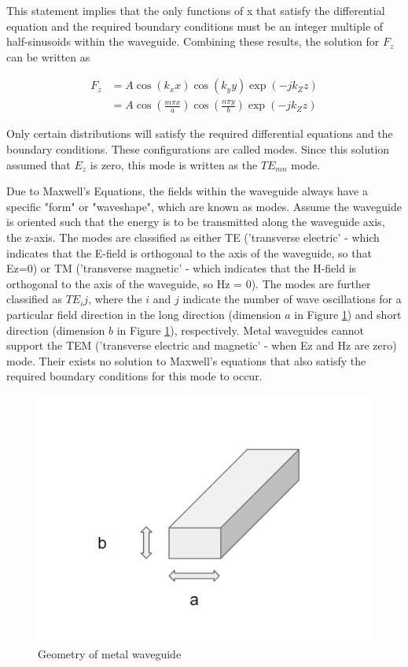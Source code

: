 \documentclass[a4paper,12pt]{report}
\begin{document}
This statement implies that the only functions of x that satisfy
the differential equation and the required boundary conditions
must be an integer multiple of half-sinusoids within the waveguide.
Combining these results, the solution for $F_z$ can be written as

\begin{equation}
  \begin{split}
    F_z &= A \cos(k_x x)\cos(k_y y)\exp(-j k_Z z) \\
        & = A \cos(\frac{m\pi x}{a}) \cos(\frac{n \pi y}{b})\exp(-j k_Z z)
  \end{split}
\end{equation}

Only certain distributions will satisfy the required differential equations
and the boundary conditions. These configurations are called modes.
Since this solution assumed that $E_z$ is zero, this mode is written as the $TE_{mn}$ mode.

Due to Maxwell's Equations,
the fields within the waveguide always have a specific "form" or "waveshape",
which are known as modes.
Assume the waveguide is oriented such that the energy is to be transmitted along the waveguide axis, the z-axis.
The modes are classified as either TE
('transverse electric' - which indicates that the E-field is orthogonal to the axis of the waveguide, so that Ez=0)
or TM ('transverse magnetic' - which indicates that the H-field is orthogonal to the axis of the waveguide, so Hz = 0).
The modes are further classified as $TE_ij$,
where the $i$ and $j$ indicate the number of wave oscillations for a particular
field direction in the long direction (dimension $a$ in Figure \ref{fig:metal_waveguide_geometry})
and short direction (dimension $b$ in Figure \ref{fig:metal_waveguide_geometry}), respectively.
Metal waveguides cannot support the TEM
('transverse electric and magnetic' - when Ez and Hz are zero) mode.
Their exists no solution to Maxwell's equations
that also satisfy the required boundary conditions for this mode to occur.

\begin{figure}
  \begin{center}
    \includegraphics[clip, keepaspectratio, width=0.5\linewidth]{img/metal_waveguide_with_dims.png}
    \caption{Geometry of metal waveguide}
    \label{fig:metal_waveguide_geometry}
  \end{center}
\end{figure}
\end{document}
